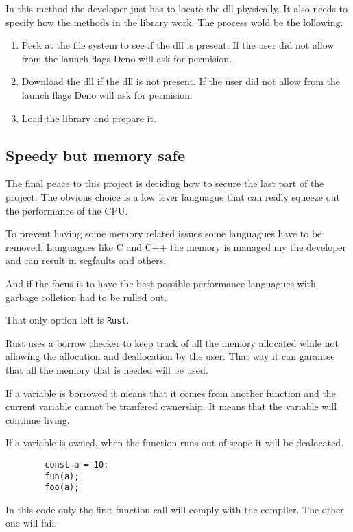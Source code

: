 \documentclass[12pt, letterpaper]{article}
\begin{document}
\begin{multicols}{2}
    In this method the developer just has to locate the dll physically. It also needs to specify how the methods in the library work.
    The process wold be the following.

    \begin{enumerate}
        \item Peek at the file system to see if the dll is present. If the user did not allow from the launch flags Deno will ask for permision.
        \item Download the dll if the dll is not present. If the user did not allow from the launch flags Deno will ask for permision.
        \item Load the library and prepare it.
    \end{enumerate}

    \subsection{Speedy but memory safe}

    The final peace to this project is deciding how to secure the last part of the project. The obvious choice is a low lever languague that can really squeeze out the performance of the CPU.

    To prevent having some memory related issues some languagues have to be removed. Languagues like C and C++ the memory is managed my the developer and can result in segfaults and others.

    And if the focus is to have the best possible performance languagues with garbage colletion had to be rulled out.

    That only option left is \verb|Rust|.

    Rust uses a borrow checker to keep track of all the memory allocated while not allowing the allocation and deallocation by the user. That way it can garantee that all the memory that is needed will be used.

    If a variable is borrowed it means that it comes from another function and the current variable cannot be tranfered ownership. It means that the variable will continue living.

    If a variable is owned, when the function runs out of scope it will be dealocated.

    \begin{lstlisting}
        const a = 10:
        fun(a);
        foo(a);
    \end{lstlisting}

    In this code only the first function call will comply with the compiler. The other one will fail.


\end{multicols}
\end{document}
